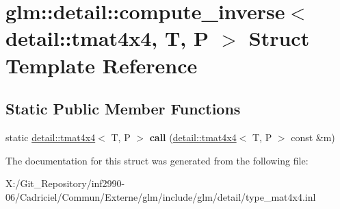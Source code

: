 \hypertarget{structglm_1_1detail_1_1compute__inverse_3_01detail_1_1tmat4x4_00_01_t_00_01_p_01_4}{\section{glm\-:\-:detail\-:\-:compute\-\_\-inverse$<$ detail\-:\-:tmat4x4, T, P $>$ Struct Template Reference}
\label{structglm_1_1detail_1_1compute__inverse_3_01detail_1_1tmat4x4_00_01_t_00_01_p_01_4}
}
\subsection*{Static Public Member Functions}
\begin{DoxyCompactItemize}
\item 
\hypertarget{structglm_1_1detail_1_1compute__inverse_3_01detail_1_1tmat4x4_00_01_t_00_01_p_01_4_a8fd080ed01ae197f2274742a8f1417f3}{static \hyperlink{structglm_1_1detail_1_1tmat4x4}{detail\-::tmat4x4}$<$ T, P $>$ {\bfseries call} (\hyperlink{structglm_1_1detail_1_1tmat4x4}{detail\-::tmat4x4}$<$ T, P $>$ const \&m)}\label{structglm_1_1detail_1_1compute__inverse_3_01detail_1_1tmat4x4_00_01_t_00_01_p_01_4_a8fd080ed01ae197f2274742a8f1417f3}

\end{DoxyCompactItemize}


The documentation for this struct was generated from the following file\-:\begin{DoxyCompactItemize}
\item 
X\-:/\-Git\-\_\-\-Repository/inf2990-\/06/\-Cadriciel/\-Commun/\-Externe/glm/include/glm/detail/type\-\_\-mat4x4.\-inl\end{DoxyCompactItemize}
